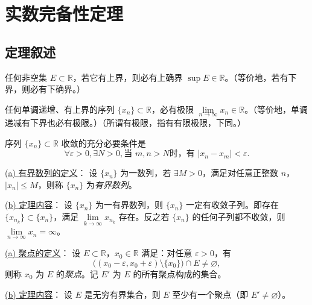 \chapter{实数完备性定理}
\section{定理叙述}
\begin{theorem}[确界原理]
任何非空集 \( E \subset \mathbb{R} \)，若它有上界，则必有上确界 \(\sup E \in \mathbb{R}\)。（等价地，若有下界，则必有下确界。）
\end{theorem}

\begin{theorem}[单调有界原理]
任何单调递增、有上界的序列 \(\{x_n\} \subset \mathbb{R}\)，必有极限 \(\lim \limits_{n \to \infty} x_n \in \mathbb{R}\)。（等价地，单调递减有下界也必有极限。）（所谓有极限，指有有限极限，下同。）
\end{theorem}

\begin{theorem}[Cauchy收敛原理]
序列 \(\{x_n\} \subset \mathbb{R}\) 收敛的充分必要条件是
\[
\forall \varepsilon > 0, \exists N > 0, \text{当 } m, n > N \text{时，有 } |x_n - x_m| < \varepsilon.
\]
\end{theorem}

\begin{theorem}\label{thm:bolzano-weierstrass}
\underline{(a) 有界数列的定义}：
设 \(\{x_n\}\) 为一数列，若 \(\exists M > 0\)，满足对任意正整数 \(n\)，\(|x_n| \leq M\)，则称 \(\{x_n\}\) 为\emph{有界数列}。

\underline{(b) 定理内容}：
设 \(\{x_n\}\) 为一有界数列，则 \(\{x_n\}\) 一定有收敛子列。即存在 \(\{x_{n_k}\} \subset \{x_n\}\)，满足 \(\lim\limits_{k \to \infty} x_{n_k}\) 存在。反之若 \(\{x_n\}\) 的任何子列都不收敛，则 \(\lim\limits_{n \to \infty} x_n = \infty\)。
\end{theorem}

\begin{theorem}[聚点定理]\label{thm:accumulation-point}
\underline{(a) 聚点的定义}：
设 \(E \subset \mathbb{R}\)，\(x_0 \in \mathbb{R}\) 满足：对任意 \(\varepsilon > 0\)，有
\[
\big( (x_0 - \varepsilon, x_0 + \varepsilon) \setminus \{x_0\} \big) \cap E \neq \varnothing,
\]
则称 \(x_0\) 为 \(E\) 的\emph{聚点}。记 \(E'\) 为 \(E\) 的所有聚点构成的集合。

\underline{(b) 定理内容}：
设 \(E\) 是无穷有界集合，则 \(E\) 至少有一个聚点（即 \(E' \neq \varnothing\)）。
\end{theorem}

